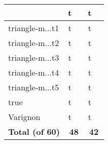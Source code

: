 {\begin{longtable}{|l|*{2}{cr|}}
& \cellcolor{green!50}t & \cellcolor{green!50}{\bf 35} 
& \cellcolor{green!30}t & \cellcolor{green!30}{\sl 241} 
\\ \hline
\cellcolor{blue!10}triangle-m$\ldots$t1 
& \cellcolor{green!50}t & \cellcolor{green!50}{\bf 30} 
& \cellcolor{green!30}t & \cellcolor{green!30}{\sl 248} 
\\ \hline
\cellcolor{blue!10}triangle-m$\ldots$t2 
& \cellcolor{green!50}t & \cellcolor{green!50}{\bf 31} 
& \cellcolor{green!30}t & \cellcolor{green!30}{\sl 257} 
\\ \hline
\cellcolor{blue!10}triangle-m$\ldots$t3 
& \cellcolor{green!50}t & \cellcolor{green!50}{\bf 37} 
& \cellcolor{green!30}t & \cellcolor{green!30}{\sl 246} 
\\ \hline
\cellcolor{blue!10}triangle-m$\ldots$t4 
& \cellcolor{green!60}t & \cellcolor{green!60}{\bf 17} 
& \cellcolor{green!30}t & \cellcolor{green!30}{\sl 239} 
\\ \hline
\cellcolor{blue!10}triangle-m$\ldots$t5 
& \cellcolor{green!50}t & \cellcolor{green!50}{\bf 37} 
& \cellcolor{green!30}t & \cellcolor{green!30}{\sl 237} 
\\ \hline
\cellcolor{blue!10}true 
& \cellcolor{green!60}t & \cellcolor{green!60}{ 2} 
& \cellcolor{green!60}t & \cellcolor{green!60}{\bf 1} 
\\ \hline
\cellcolor{blue!10}Varignon 
& \cellcolor{green!50}t & \cellcolor{green!50}{\bf 38} 
& \cellcolor{green!30}t & \cellcolor{green!30}{\sl 246} 
\\ \hline
{\bf Total (of 60)}
&\multicolumn{2}{c|}{\bf 48}
&\multicolumn{2}{c|}{\bf 42}
\\ \hline
\end{longtable}
}
